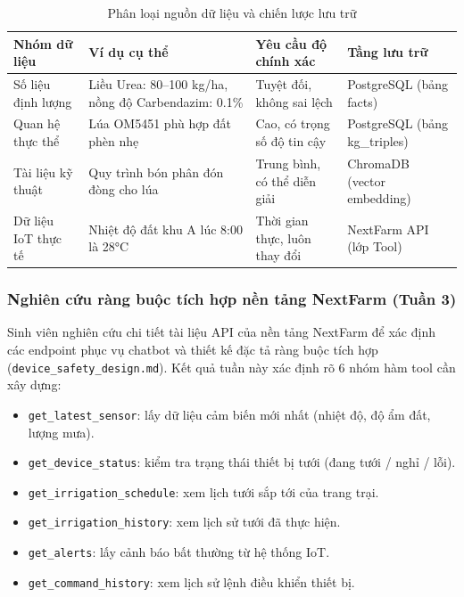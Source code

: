 \begin{table}[H]
\caption{Phân loại nguồn dữ liệu và chiến lược lưu trữ}
\label{tab:phan-loai-du-lieu}
\centering
\begin{tabular}{|p{3cm}|p{3.5cm}|p{3.5cm}|p{3.5cm}|}
\hline
\textbf{Nhóm dữ liệu} & \textbf{Ví dụ cụ thể} & \textbf{Yêu cầu độ chính xác} & \textbf{Tầng lưu trữ} \\
\hline
Số liệu định lượng & Liều Urea: 80--100 kg/ha, nồng độ Carbendazim: 0.1\% & Tuyệt đối, không sai lệch & PostgreSQL (bảng facts) \\
\hline
Quan hệ thực thể & Lúa OM5451 phù hợp đất phèn nhẹ & Cao, có trọng số độ tin cậy & PostgreSQL (bảng kg\_triples) \\
\hline
Tài liệu kỹ thuật & Quy trình bón phân đón đòng cho lúa & Trung bình, có thể diễn giải & ChromaDB (vector embedding) \\
\hline
Dữ liệu IoT thực tế & Nhiệt độ đất khu A lúc 8:00 là 28°C & Thời gian thực, luôn thay đổi & NextFarm API (lớp Tool) \\
\hline
\end{tabular}
\end{table}

\subsubsection{Nghiên cứu ràng buộc tích hợp nền tảng NextFarm (Tuần 3)}

Sinh viên nghiên cứu chi tiết tài liệu API của nền tảng NextFarm để xác định các endpoint phục vụ chatbot và thiết kế đặc tả ràng buộc tích hợp (\texttt{device\_safety\_design.md}). Kết quả tuần này xác định rõ 6 nhóm hàm tool cần xây dựng:

\begin{itemize}
    \item \texttt{get\_latest\_sensor}: lấy dữ liệu cảm biến mới nhất (nhiệt độ, độ ẩm đất, lượng mưa).
    \item \texttt{get\_device\_status}: kiểm tra trạng thái thiết bị tưới (đang tưới / nghỉ / lỗi).
    \item \texttt{get\_irrigation\_schedule}: xem lịch tưới sắp tới của trang trại.
    \item \texttt{get\_irrigation\_history}: xem lịch sử tưới đã thực hiện.
    \item \texttt{get\_alerts}: lấy cảnh báo bất thường từ hệ thống IoT.
    \item \texttt{get\_command\_history}: xem lịch sử lệnh điều khiển thiết bị.
\end{itemize}

